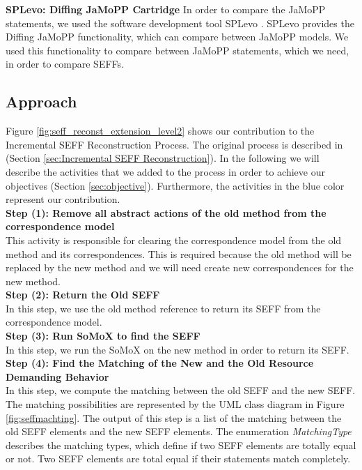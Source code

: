 \textbf{SPLevo: Diffing JaMoPP Cartridge}
In order to compare the JaMoPP statements, we used the software development tool SPLevo \cite{klatt2016consolidation}. SPLevo provides the Diffing JaMoPP functionality, which can compare between JaMoPP models. We used this functionality to compare between JaMoPP statements, which we need, in order to compare SEFFs.

\subsection{Approach}
\label{sec:approach}
Figure \ref{fig:seff_reconst_extension_level2} shows our contribution to the Incremental SEFF Reconstruction Process. The original process is described in (Section \ref{sec:Incremental SEFF Reconstruction}). In the following we will describe the activities that we added to the process in order to achieve our objectives (Section \ref{sec:objective}). Furthermore, the activities in the blue color represent our contribution.\\

\textbf{Step (1): Remove all abstract actions of the old method from the correspondence model}\\
This activity is responsible for clearing the correspondence model from the old method and its correspondences. This is required because the old method will be replaced by the new method and we will need create new correspondences for the new method.\\

\textbf{Step (2): Return the Old SEFF}\\
In this step, we use the old method reference to return its SEFF from the correspondence model.\\

\textbf{Step (3): Run SoMoX to find the SEFF}\\
In this step, we run the SoMoX on the new method in order to return its SEFF. \\

\textbf{Step (4): Find the Matching of the New and the Old Resource Demanding Behavior}\\
In this step, we compute the matching between the old SEFF and the new SEFF. The matching possibilities are represented by the UML class diagram in Figure \ref{fig:seffmachting}.  The output of this step is a list of the matching between the old SEFF elements and the new SEFF elements. The enumeration \textit{MatchingType} describes the matching types, which define if two SEFF elements are totally equal or not. Two SEFF elements are total equal if their statements match completely. 

